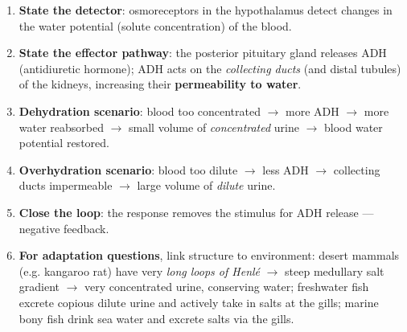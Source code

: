 \documentclass[11pt]{article}
\newcommand{\cle}[1]{{\popxbold\color{popdark}#1}}
\begin{document}
\begin{methode}
\begin{enumerate}
\item \textbf{State the detector}: \cle{osmoreceptors} in the hypothalamus detect changes in the water potential (solute concentration) of the blood.
\item \textbf{State the effector pathway}: the posterior \cle{pituitary gland} releases \cle{ADH} (antidiuretic hormone); ADH acts on the \emph{collecting ducts} (and distal tubules) of the kidneys, increasing their \textbf{permeability to water}.
\item \textbf{Dehydration scenario}: blood too concentrated $\rightarrow$ more ADH $\rightarrow$ more water reabsorbed $\rightarrow$ small volume of \emph{concentrated} urine $\rightarrow$ blood water potential restored.
\item \textbf{Overhydration scenario}: blood too dilute $\rightarrow$ less ADH $\rightarrow$ collecting ducts impermeable $\rightarrow$ large volume of \emph{dilute} urine.
\item \textbf{Close the loop}: the response removes the stimulus for ADH release — negative feedback.
\item \textbf{For adaptation questions}, link structure to environment: desert mammals (e.g. kangaroo rat) have very \emph{long loops of Henlé} $\rightarrow$ steep medullary salt gradient $\rightarrow$ very concentrated urine, conserving water; freshwater fish excrete copious dilute urine and actively take in salts at the gills; marine bony fish drink sea water and excrete salts via the gills.
\end{enumerate}
\end{methode}
\end{document}
